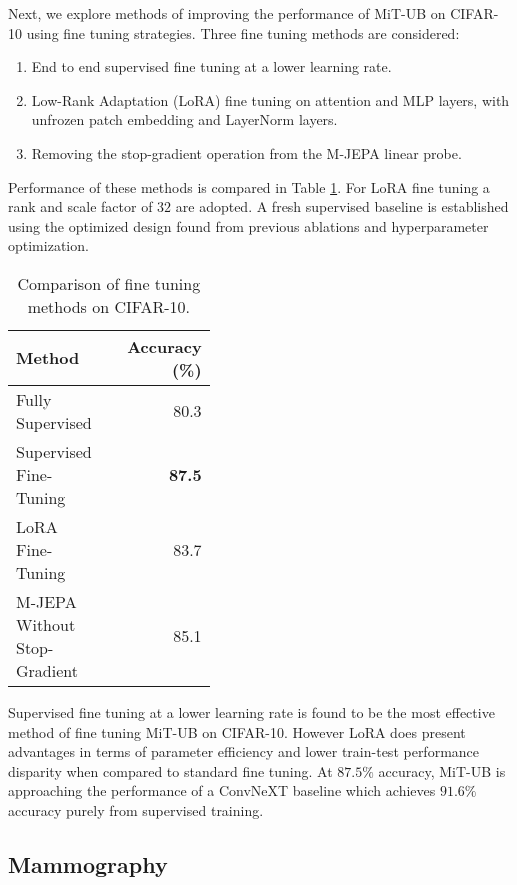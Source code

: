 \documentclass[12pt]{article}
\begin{document}
Next, we explore methods of improving the performance of MiT-UB on CIFAR-10 using fine tuning strategies. Three fine tuning methods are considered:

\begin{enumerate}
    \item End to end supervised fine tuning at a lower learning rate.
    \item Low-Rank Adaptation (LoRA) \cite{hu2021lora} fine tuning on attention and MLP layers, with unfrozen patch embedding and LayerNorm layers.
    \item Removing the stop-gradient operation from the M-JEPA linear probe.
\end{enumerate}

Performance of these methods is compared in Table \ref{tab:cifar10-tune-method}. For LoRA fine tuning a rank and scale factor of $32$ are adopted. 
A fresh supervised baseline is established using the optimized design found from previous ablations and hyperparameter optimization.

\begin{table}[H]
    \centering
    \begin{tabular}{p{0.4\linewidth}r}
        \toprule
        Method & Accuracy (\%) \\
        \midrule
        Fully Supervised & 80.3 \\
        \midrule
        Supervised Fine-Tuning & \textbf{87.5} \\
        LoRA Fine-Tuning &  83.7 \\
        M-JEPA Without Stop-Gradient & 85.1 \\
        \bottomrule
    \end{tabular}
    \caption{Comparison of fine tuning methods on CIFAR-10.}
    \label{tab:cifar10-tune-method}
\end{table}

Supervised fine tuning at a lower learning rate is found to be the most effective method of fine tuning MiT-UB on CIFAR-10. However LoRA does present advantages
in terms of parameter efficiency and lower train-test performance disparity when compared to standard fine tuning. At $87.5\%$ accuracy, MiT-UB is approaching the
performance of a ConvNeXT \cite{liu2022convnext} baseline which achieves $91.6\%$ accuracy purely from supervised training.

\subsection{Mammography}
\end{document}
